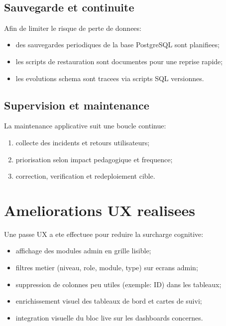 ﻿﻿\documentclass[12pt,a4paper,oneside]{report}
\begin{document}
\subsection{Sauvegarde et continuite}

Afin de limiter le risque de perte de donnees:
\begin{itemize}
  \item des sauvegardes periodiques de la base PostgreSQL sont planifiees;
  \item les scripts de restauration sont documentes pour une reprise rapide;
  \item les evolutions schema sont tracees via scripts SQL versionnes.
\end{itemize}

\subsection{Supervision et maintenance}

La maintenance applicative suit une boucle continue:
\begin{enumerate}
  \item collecte des incidents et retours utilisateurs;
  \item priorisation selon impact pedagogique et frequence;
  \item correction, verification et redeploiement cible.
\end{enumerate}

\section{Ameliorations UX realisees}

Une passe UX a ete effectuee pour reduire la surcharge cognitive:
\begin{itemize}
  \item affichage des modules admin en grille lisible;
  \item filtres metier (niveau, role, module, type) sur ecrans admin;
  \item suppression de colonnes peu utiles (exemple: ID) dans les tableaux;
  \item enrichissement visuel des tableaux de bord et cartes de suivi;
  \item integration visuelle du bloc live sur les dashboards concernes.
\end{itemize}
\end{document}
